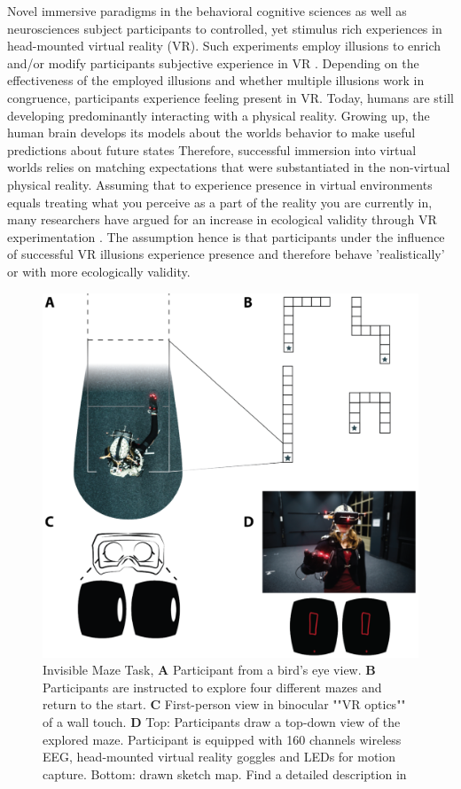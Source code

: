 Novel immersive paradigms in the behavioral cognitive sciences as well as neurosciences subject participants to controlled, yet stimulus rich experiences in head-mounted virtual reality (VR). Such experiments employ illusions to enrich and/or modify participants subjective experience in VR \citep{Gonzalez-Franco2017}. Depending on the effectiveness of the employed illusions and whether multiple illusions work in congruence, participants experience feeling present in VR. Today, humans are still developing predominantly interacting with a physical reality. Growing up, the human brain develops its models about the worlds behavior to make useful predictions about future states \cite{} %
Therefore, successful immersion into virtual worlds relies on matching expectations that were substantiated in the non-virtual physical reality. Assuming that to experience presence in virtual environments equals treating what you perceive as a part of the reality you are currently in, many researchers have argued for an increase in ecological validity through VR experimentation \citep{Bohil2011, Parsons2015, Parsons2017}. The assumption hence is that participants under the influence of successful VR illusions experience presence and therefore behave 'realistically' or with more ecologically validity.

\begin{figure}[h]
\centering
\includegraphics[width=.8\linewidth]{figures/IMT_Task.png}
\vspace{0pt}
\caption{Invisible Maze Task, \textbf{A} Participant from a bird’s eye view. \textbf{B} Participants are instructed to explore four different mazes and return to the start. \textbf{C} First-person view in binocular ""VR optics"" of a wall touch. \textbf{D} Top: Participants draw a top-down view of the explored maze. Participant is equipped with 160 channels wireless EEG, head-mounted virtual reality goggles and LEDs for motion capture. Bottom: drawn sketch map. Find a detailed description in \citep{Gehrke2018}}
\label{imt_task}
\end{figure}

